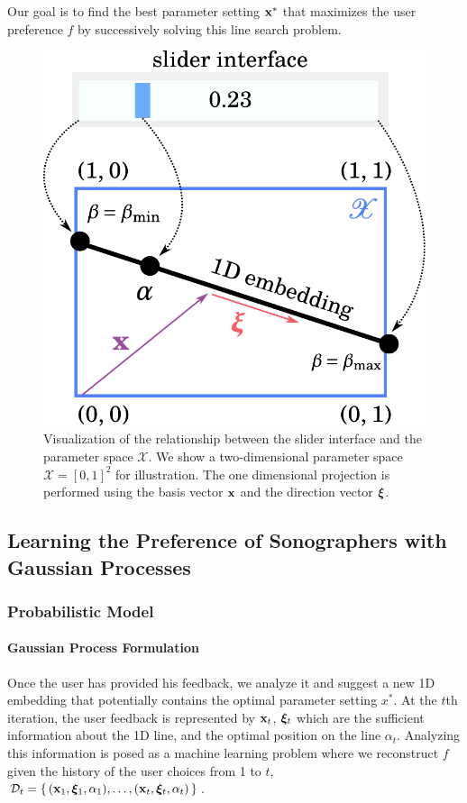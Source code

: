 Our goal is to find the best parameter setting \(\mathbf{x}^{*}\) that maximizes the user preference \(f\) by successively solving this line search problem.

\begin{figure}[t]
  \centering
  \includegraphics[scale=0.35]{figures/linesearch.pdf}
  \caption{Visualization of the relationship between the slider interface and the parameter space \(\mathcal{X}\).
    We show a two-dimensional parameter space \(\mathcal{X} = {[0, 1]}^2\) for illustration.
    The one dimensional projection is performed using the basis vector \(\mathbf{x}\) and the direction vector \(\bm{\xi}\).
  }\label{fig:linesearch}
\end{figure}
%

\subsection{Learning the Preference of Sonographers with Gaussian Processes}\label{section:gp}
\subsubsection{Probabilistic Model}
\paragraph{Gaussian Process Formulation}
Once the user has provided his feedback, we analyze it and suggest a new 1D embedding that potentially contains the optimal parameter setting \(x^{*}\).
At the \(t\)th iteration, the user feedback is represented by \(\mathbf{x}_t\), \(\bm{\xi}_t\) which are the sufficient information about the 1D line, and the optimal position on the line \(\alpha_t\).
Analyzing this information is posed as a machine learning problem where we reconstruct \(f\) given the history of the user choices from 1 to \(t\), \(\mathcal{D}_t = \{\,(\mathbf{x}_1, \bm{\xi}_1, \alpha_1), \ldots, (\mathbf{x}_t, \bm{\xi}_t, \alpha_t)\,\}\).

